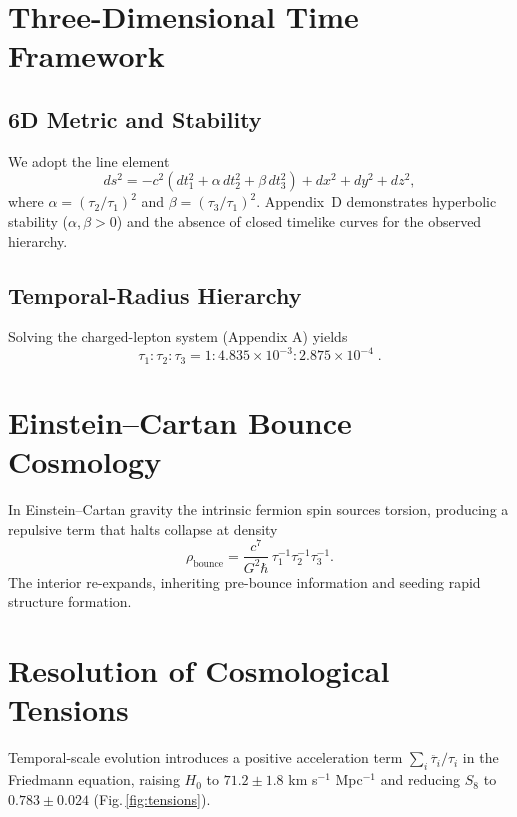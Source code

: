 \documentclass[reprint,amsmath,amssymb,aps,prd,nofootinbib,longbibliography]{revtex4-2}
\begin{document}
\section{Three-Dimensional Time Framework}\label{sec:framework}
\subsection{6D Metric and Stability}
We adopt the line element
\begin{equation}
ds^2=-c^2\!\left(dt_1^2+\alpha\,dt_2^2+\beta\,dt_3^2\right)+dx^2+dy^2+dz^2 ,
\end{equation}
where $\alpha=(\tau_2/\tau_1)^2$ and $\beta=(\tau_3/\tau_1)^2$.  
Appendix~D demonstrates hyperbolic stability ($\alpha,\beta>0$) and the absence of closed timelike curves for the observed hierarchy.

\subsection{Temporal-Radius Hierarchy}
Solving the charged-lepton system (Appendix A) yields
\begin{equation}
\tau_1 : \tau_2 : \tau_3 = 1 : 4.835\times10^{-3} : 2.875\times10^{-4}\; .
\end{equation}

\section{Einstein–Cartan Bounce Cosmology}\label{sec:bounce}
In Einstein–Cartan gravity the intrinsic fermion spin sources torsion, producing a repulsive term that halts collapse at density
\begin{equation}
\rho_{\text{bounce}}=\frac{c^7}{G^2\hbar}\,\tau_1^{-1}\tau_2^{-1}\tau_3^{-1}.
\end{equation}
The interior re-expands, inheriting pre-bounce information and seeding rapid structure formation.

\section{Resolution of Cosmological Tensions}\label{sec:tensions}
Temporal-scale evolution introduces a positive acceleration term $\sum_i\ddot{\tau_i}/\tau_i$ in the Friedmann equation, raising $H_0$ to $71.2\pm1.8$ km s$^{-1}$ Mpc$^{-1}$ and reducing $S_8$ to $0.783\pm0.024$ (Fig.\,\ref{fig:tensions}).
\end{document}

